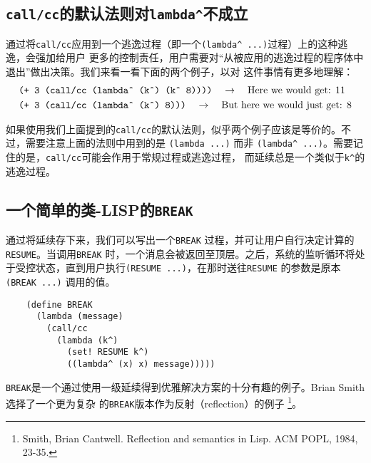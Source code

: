 \documentclass[12pt]{article}
\begin{document}
\subsection{\texttt{call/cc}的默认法则对\texttt{lambda\^{}}不成立}
\indent{}通过将\texttt{call/cc}应用到一个逃逸过程（即一个\texttt{(lambda\^{} ...)}过程）上的这种逃逸，会强加给用户
更多的控制责任，用户需要对``从被应用的逃逸过程的程序体中退出''做出决策。我们来看一看下面的两个例子，以对
这件事情有更多地理解：
\begin{align*}
&\textrm{\texttt{(+ 3 (call/cc (lambda\^{} (k\^{}) (k\^{} 8))))}} \quad\rightarrow \quad\textrm{Here we would get: 11}\\
&\textrm{\texttt{(+ 3 (call/cc (lambda\^{} (k\^{}) 8)))}} \quad\rightarrow \quad \textrm{But here we would just get: 8}
\end{align*}

\indent{}如果使用我们上面提到的\texttt{call/cc}的默认法则，似乎两个例子应该是等价的。不过，需要注意上面的法则中用到的是
\texttt{(lambda ...)} 而非 \texttt{(lambda\^{} ...)}。需要记住的是，\texttt{call/cc}可能会作用于常规过程或逃逸过程，
而延续总是一个类似于\texttt{k\^{}}的逃逸过程。

\subsection{一个简单的类-LISP的\texttt{BREAK}}
\indent{}通过将延续存下来，我们可以写出一个\texttt{BREAK} 过程，并可让用户自行决定计算的\texttt{RESUME}。当调用\texttt{BREAK}
时，一个消息会被返回至顶层。之后，系统的监听循环将处于受控状态，直到用户执行\texttt{(RESUME ...)}，在那时送往\texttt{RESUME}
的参数是原本\texttt{(BREAK ...)} 调用的值。
\begin{verbatim}
    (define BREAK
      (lambda (message)
        (call/cc
          (lambda (k^)
            (set! RESUME k^)
            ((lambda^ (x) x) message)))))
\end{verbatim}
\noindent{}\texttt{BREAK}是一个通过使用一级延续得到优雅解决方案的十分有趣的例子。Brian Smith 选择了一个更为复杂
的\texttt{BREAK}版本作为反射（reflection）的例子%
\footnote{Smith, Brian Cantwell. Reflection and semantics in Lisp. ACM POPL, 1984, 23-35.}。
\end{document}
